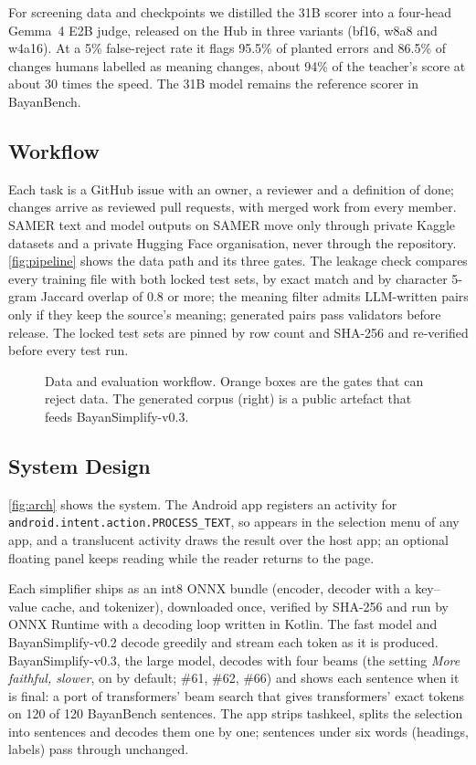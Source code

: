 \documentclass[10pt,a4paper]{article}
\newcommand{\vTwo}{BayanSimplify-v0.2}
\newcommand{\vThree}{BayanSimplify-v0.3}
\begin{document}
 For screening data and checkpoints we
distilled the 31B scorer into a four-head Gemma~4 E2B judge, released on the Hub
in three variants (bf16, w8a8 and w4a16). At a 5\% false-reject rate it flags
95.5\% of planted errors and 86.5\% of changes humans labelled as meaning changes,
about 94\% of the teacher's score at about 30 times the speed. The 31B model
remains the reference scorer in BayanBench.

\subsection{Workflow}

Each task is a GitHub issue with an owner, a reviewer and a definition of done;
changes arrive as reviewed pull requests, with merged work from every member. SAMER
text and model outputs on SAMER move only through private Kaggle datasets and a
private Hugging Face organisation, never through the repository.
\autoref{fig:pipeline} shows the data path and its three gates. The leakage check
compares every training file with both locked test sets, by exact match and by
character 5-gram Jaccard overlap of 0.8 or more; the meaning filter admits
LLM-written pairs only if they keep the source's meaning; generated pairs pass
validators before release. The locked test sets are pinned by row count and
SHA-256 and re-verified before every test run.

\begin{figure}[h]
\centering
\figpipeline
\caption{Data and evaluation workflow. Orange boxes are the gates that can reject
data. The generated corpus (right) is a public artefact that feeds \vThree{}.}
\label{fig:pipeline}
\end{figure}

\subsection{System Design}
\label{sec:design}

\autoref{fig:arch} shows the system. The Android app registers an activity for
\texttt{android.\allowbreak intent.\allowbreak action.\allowbreak PROCESS\_TEXT},
so  appears in the selection menu of any app, and a translucent activity
draws the result over the host app; an optional floating panel keeps reading while
the reader returns to the page.

 Each simplifier ships as an int8 ONNX bundle (encoder, decoder
with a key--value cache, and tokenizer), downloaded once, verified by SHA-256 and
run by ONNX Runtime with a decoding loop written in Kotlin. The fast model and
\vTwo{} decode greedily and stream each token as it is produced. \vThree{}, the
large model, decodes with four beams (the setting \emph{More faithful, slower}, on
by default; \#61, \#62, \#66) and shows each sentence when it is final: a port of
transformers' beam search that gives transformers' exact tokens on 120 of 120
BayanBench sentences. The app strips tashkeel, splits the selection into sentences
and decodes them one by one; sentences under six words (headings, labels) pass
through unchanged.
\end{document}
